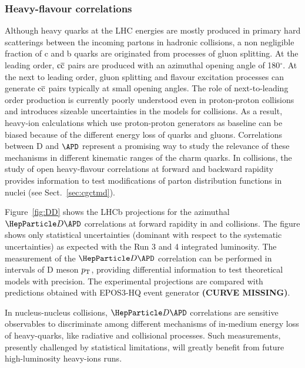 \subsubsection{Heavy-flavour correlations}
Although heavy quarks at the LHC energies are mostly produced in primary hard scatterings between the incoming partons in hadronic collisions, a non negligible fraction of c and b quarks are originated from processes of gluon splitting. At the leading order, $\rm c\overline c$ pairs are produced with an azimuthal opening angle of 180$^\circ$. At the next to leading order, gluon splitting and flavour excitation processes can generate $\rm c\overline c$ pairs typically at small opening angles. The role of next-to-leading order production is currently poorly understood even in proton-proton collisions \cite{LHCb-PAPER-2012-003,LorentzpaperHF} and introduces sizeable uncertainties in the models for \PbPb collisions. As a result, heavy-ion calculations which use proton-proton generators as baseline can be biased because of the different energy loss of quarks and gluons. Correlations between D and $\APD$ represent a promising way to study the relevance of these mechanisms in different kinematic ranges of the charm quarks. In \pPb collisions, the study of open heavy-flavour correlations at forward and backward rapidity provides information to test modifications of parton distribution functions in nuclei (see Sect.~\ref{sec:cgctmd}). 

Figure~\ref{fig:DD} shows the LHCb projections for the azimuthal ${\PD \APD}$ correlations at forward rapidity in \pp and \pPb collisions. The figure shows only statistical uncertainties (dominant with respect to the systematic uncertainties) as expected with the Run 3 and 4 integrated luminosity. The measurement of the $\PD \APD$ correlation can be performed in intervals of D meson $p\sb{\scriptstyle\mathrm{T}}$, providing differential information to test theoretical models with precision. The experimental projections are compared with predictions obtained with EPOS3-HQ event generator \textbf{(CURVE MISSING)}. 

In nucleus-nucleus collisions, ${\PD \APD}$ correlations are sensitive observables to discriminate among different mechanisms of in-medium energy loss of heavy-quarks, like radiative and collisional processes. Such measurements, presently challenged by statistical limitations, will greatly benefit from future high-luminosity heavy-ions runs. 

